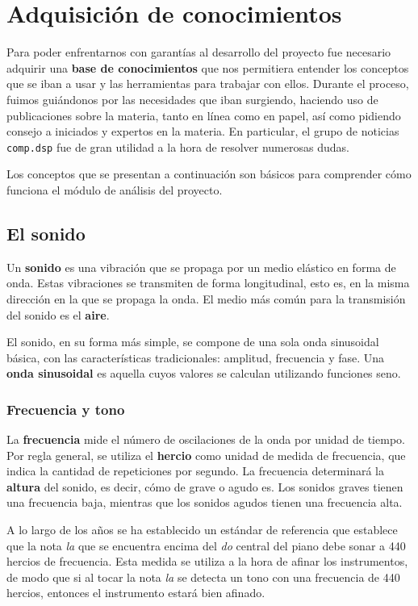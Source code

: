 \section{Adquisición de conocimientos}
Para poder enfrentarnos con garantías al desarrollo del proyecto fue necesario
adquirir una \textbf{base de conocimientos} que nos permitiera entender los
conceptos que se iban a usar y las herramientas para trabajar con ellos. Durante
el proceso, fuimos guiándonos por las necesidades que iban surgiendo, haciendo
uso de publicaciones sobre la materia, tanto en línea como en papel, así como
pidiendo consejo a iniciados y expertos en la materia. En particular, el grupo
de noticias \texttt{comp.dsp} fue de gran utilidad a la hora de resolver
numerosas dudas.

Los conceptos que se presentan a continuación son básicos para comprender cómo
funciona el módulo de análisis del proyecto.

\subsection{El sonido}
Un \textbf{sonido} es una vibración que se propaga por un medio
elástico en forma de onda. Estas vibraciones se transmiten de forma
longitudinal, esto es, en la misma dirección en la que se propaga la
onda. El medio más común para la transmisión del sonido es el
\textbf{aire}. 

El sonido, en su forma más simple, se compone de una sola onda
sinusoidal básica, con las características tradicionales: amplitud,
frecuencia y fase. Una \textbf{onda sinusoidal} es aquella cuyos
valores se calculan utilizando funciones seno.

\subsubsection{Frecuencia y tono}
La \textbf{frecuencia} mide el número de oscilaciones de la onda por
unidad de tiempo. Por regla general, se utiliza el \textbf{hercio}
como unidad de medida de frecuencia, que indica la cantidad de
repeticiones por segundo. La frecuencia determinará la \textbf{altura}
del sonido, es decir, cómo de grave o agudo es. Los sonidos graves
tienen una frecuencia baja, mientras que los sonidos agudos tienen una
frecuencia alta.

A lo largo de los años se ha establecido un estándar de referencia que
establece que la nota \textit{la} que se encuentra encima del
\textit{do} central del piano debe sonar a 440 hercios de
frecuencia. Esta medida se utiliza a la hora de afinar los
instrumentos, de modo que si al tocar la nota \textit{la} se detecta
un tono con una frecuencia de 440 hercios, entonces el instrumento
estará bien afinado.


